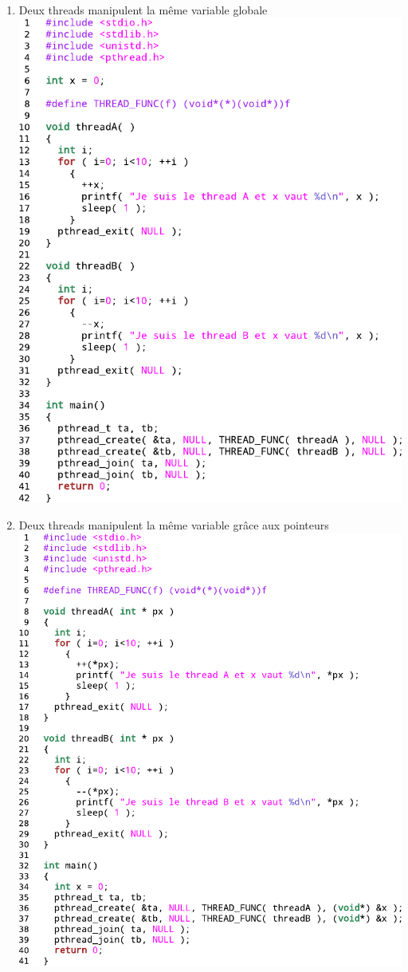 \begin{enumerate}
	\item Deux threads manipulent la même variable globale \\
\includegraphics[width=\linewidth]{fig26.pdf}\newpage
	\item Deux threads manipulent la même variable grâce aux pointeurs \\
\includegraphics[width=\linewidth]{fig27.pdf}\\

\end{enumerate}
